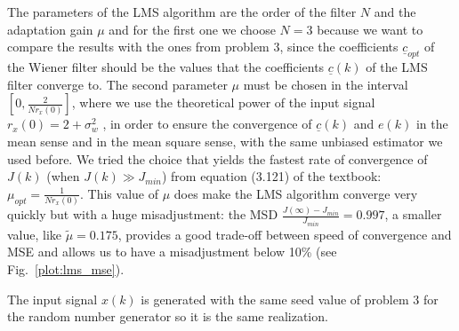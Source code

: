 \documentclass{article}
\renewcommand{\vec}[1]{\underline{#1}}
\newcommand{\E}[1]{\operatorname{E}\left[#1\right]}
\newcommand{\norm}[1]{\left\lVert#1\right\rVert}
\newcommand{\abs}[1]{\left|#1\right|}
\begin{document}
The parameters of the LMS algorithm are the order of the filter $N$
and the adaptation gain $\mu$ and for the first one we choose $N = 3$
because we want to compare the results with the ones from problem 3,
since the coefficients $\vec{c}_{opt}$ of the Wiener filter should be
the values that the coefficients $\vec{c}(k)$ of the LMS filter
converge to.  The second parameter $\mu$ must be chosen in the
interval $\left[0,\frac{2}{Nr_x(0)}\right]$, where we use the
theoretical power of the input signal $r_x(0) = 2 + \sigma^2_w$ , in
order to ensure the convergence of $\vec{c}(k)$ and $e(k)$ in the mean
sense and in the mean square sense,
with the same unbiased estimator we used before.  We tried the choice
that yields the fastest rate of convergence of $J(k)$ (when $J(k) \gg
J_{min}$) from equation (3.121) of the textbook: $\mu_{opt} =
\frac{1}{Nr_x(0)}$. This value of $\mu$ does make the LMS algorithm
converge very quickly but with a huge misadjustment: the MSD
$\frac{J(\infty) - J_{min}}{J_{min}} = 0.997$, a smaller value, like
$\tilde{\mu} = 0.175$, provides a good trade-off between speed of
convergence and MSE and allows us to have a misadjustment below 10\%
(see Fig.~\ref{plot:lms_mse}).

The input signal $x(k)$ is generated with the same seed value of
problem 3 for the random number generator so it is the same
realization.
\end{document}
